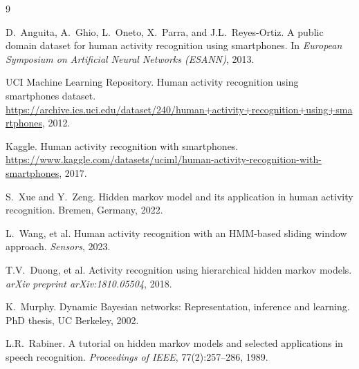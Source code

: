 \documentclass[11pt,a4paper]{article}
\begin{document}

\begin{thebibliography}{9}

D.~Anguita, A.~Ghio, L.~Oneto, X.~Parra, and J.L.~Reyes-Ortiz.
\newblock A public domain dataset for human activity recognition using smartphones.
\newblock In \emph{European Symposium on Artificial Neural Networks (ESANN)}, 2013.

UCI Machine Learning Repository.
\newblock Human activity recognition using smartphones dataset.
\newblock \url{https://archive.ics.uci.edu/dataset/240/human+activity+recognition+using+smartphones}, 2012.

Kaggle.
\newblock Human activity recognition with smartphones.
\newblock \url{https://www.kaggle.com/datasets/uciml/human-activity-recognition-with-smartphones}, 2017.

S.~Xue and Y.~Zeng.
\newblock Hidden markov model and its application in human activity recognition.
\newblock Bremen, Germany, 2022.

L.~Wang, et al.
\newblock Human activity recognition with an HMM-based sliding window approach.
\newblock \emph{Sensors}, 2023.

T.V.~Duong, et al.
\newblock Activity recognition using hierarchical hidden markov models.
\newblock \emph{arXiv preprint arXiv:1810.05504}, 2018.

K.~Murphy.
\newblock Dynamic Bayesian networks: Representation, inference and learning.
\newblock PhD thesis, UC Berkeley, 2002.

L.R.~Rabiner.
\newblock A tutorial on hidden markov models and selected applications in speech recognition.
\newblock \emph{Proceedings of IEEE}, 77(2):257--286, 1989.

\end{thebibliography}
\end{document}
